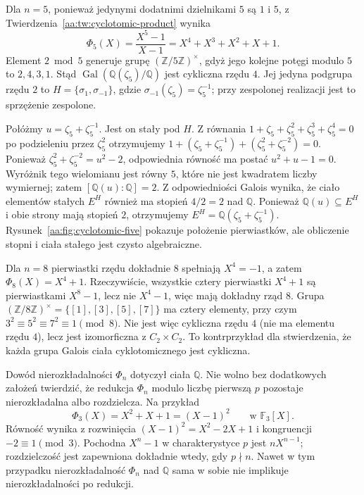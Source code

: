\begin{przyklad}
\label{aa:prz:cyclotomic-five}
Dla $n=5$, ponieważ jedynymi dodatnimi dzielnikami $5$
są $1$ i $5$, z Twierdzenia~\ref{aa:tw:cyclotomic-product}
wynika
\[
\Phi_5(X)=\frac{X^5-1}{X-1}
=X^4+X^3+X^2+X+1.
\]
Element $2\bmod5$ generuje grupę
$(\mathbb Z/5\mathbb Z)^\times$, gdyż jego kolejne
potęgi modulo $5$ to $2,4,3,1$.
Stąd $\operatorname{Gal}(\mathbb Q(\zeta_5)/\mathbb Q)$
jest cykliczna rzędu $4$.
Jej jedyna podgrupa rzędu $2$ to
$H=\{\sigma_1,\sigma_{-1}\}$, gdzie
$\sigma_{-1}(\zeta_5)=\zeta_5^{-1}$; przy zespolonej
realizacji jest to sprzężenie zespolone.

Połóżmy $u=\zeta_5+\zeta_5^{-1}$. Jest on stały pod
$H$. Z równania
$1+\zeta_5+\zeta_5^2+\zeta_5^3+\zeta_5^4=0$
po podzieleniu przez $\zeta_5^2$ otrzymujemy
$1+(\zeta_5+\zeta_5^{-1})
 +(\zeta_5^2+\zeta_5^{-2})=0$.
Ponieważ
$\zeta_5^2+\zeta_5^{-2}=u^2-2$,
odpowiednia równość ma postać
$u^2+u-1=0$. Wyróżnik tego wielomianu jest równy $5$,
które nie jest kwadratem liczby wymiernej; zatem
$[\mathbb Q(u):\mathbb Q]=2$.
Z odpowiedniości Galois wynika, że ciało elementów stałych $E^H$
również ma stopień $4/2=2$ nad $\mathbb Q$.
Ponieważ $\mathbb Q(u)\subseteq E^H$ i obie strony mają
stopień $2$, otrzymujemy
$E^H=\mathbb Q(\zeta_5+\zeta_5^{-1})$.
Rysunek~\ref{aa:fig:cyclotomic-five} pokazuje położenie
pierwiastków, ale obliczenie stopni i ciała stałego jest
czysto algebraiczne.
\end{przyklad}

\begin{przyklad}
\label{aa:prz:cyclotomic-eight}
Dla $n=8$ pierwiastki rzędu dokładnie $8$ spełniają
$X^4=-1$, a zatem $\Phi_8(X)=X^4+1$. Rzeczywiście,
wszystkie cztery pierwiastki $X^4+1$ są pierwiastkami
$X^8-1$, lecz nie $X^4-1$, więc mają dokładny rząd $8$.
Grupa
$(\mathbb Z/8\mathbb Z)^\times=\{[1],[3],[5],[7]\}$
ma cztery elementy, przy czym
$3^2\equiv5^2\equiv7^2\equiv1\pmod8$.
Nie jest więc cykliczna rzędu $4$ (nie ma elementu
rzędu $4$), lecz jest izomorficzna z $C_2\times C_2$.
To kontrprzykład dla stwierdzenia, że każda grupa
Galois ciała cyklotomicznego jest cykliczna.
\end{przyklad}

\begin{uwaga}
\label{aa:uw:cyclotomic-characteristic}
Dowód nierozkładalności $\Phi_n$ dotyczył ciała
$\mathbb Q$. Nie wolno bez dodatkowych założeń twierdzić,
że redukcja $\Phi_n$ modulo liczbę pierwszą $p$ pozostaje
nierozkładalna albo rozdzielcza. Na przykład
\[
\Phi_3(X)=X^2+X+1=(X-1)^2
\qquad\text{w }\mathbb F_3[X].
\]
Równość wynika z rozwinięcia $(X-1)^2=X^2-2X+1$
i kongruencji $-2\equiv1\pmod3$.
Pochodna $X^n-1$ w charakterystyce $p$ jest
$nX^{n-1}$; rozdzielczość jest zapewniona dokładnie
wtedy, gdy $p\nmid n$. Nawet w tym przypadku
nierozkładalność $\Phi_n$ nad $\mathbb Q$ sama w sobie
nie implikuje nierozkładalności po redukcji.
\end{uwaga}
